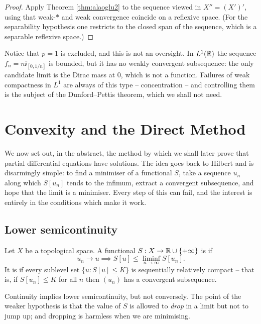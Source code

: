 \documentclass[a4paper]{scrartcl}
\begin{document}
\begin{proof}
	Apply Theorem \ref{thm:alaoglu2} to the sequence viewed in $X'' = (X')'$, using that weak-$*$ and weak convergence coincide on a reflexive space. (For the separability hypothesis one restricts to the closed span of the sequence, which is a separable reflexive space.)
\end{proof}

Notice that $p=1$ is excluded, and this is not an oversight. In $L^1(\mathbb{R})$ the sequence $f_n = n \ii_{[0,1/n]}$ is bounded, but it has no weakly convergent subsequence: the only candidate limit is the Dirac mass at $0$, which is not a function. Failures of weak compactness in $L^1$ are always of this type -- concentration -- and controlling them is the subject of the Dunford--Pettis theorem, which we shall not need.

\section{Convexity and the Direct Method}\label{sec:direct}

We now set out, in the abstract, the method by which we shall later prove that partial differential equations have solutions. The idea goes back to Hilbert and is disarmingly simple: to find a minimiser of a functional $S$, take a sequence $u_n$ along which $S[u_n]$ tends to the infimum, extract a convergent subsequence, and hope that the limit is a minimiser. Every step of this can fail, and the interest is entirely in the conditions which make it work.

\subsection{Lower semicontinuity}

\begin{definition}
	Let $X$ be a topological space. A functional $S : X \to \mathbb{R} \cup \{+\infty\}$ is  if
	$$u_n \to u \implies S[u] \le \liminf_{n\to\infty}S[u_n].$$
	It is  if every sublevel set $\{u : S[u] \le K\}$ is sequentially relatively compact -- that is, if $S[u_n]\le K$ for all $n$ then $(u_n)$ has a convergent subsequence.
\end{definition}

Continuity implies lower semicontinuity, but not conversely. The point of the weaker hypothesis is that the value of $S$ is allowed to \emph{drop} in a limit but not to jump up; and dropping is harmless when we are minimising.
\end{document}
